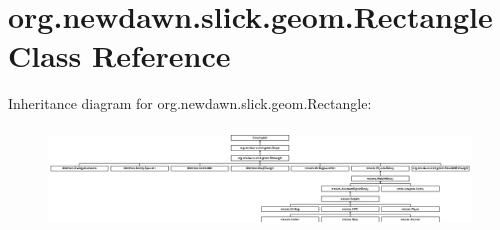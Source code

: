 \hypertarget{classorg_1_1newdawn_1_1slick_1_1geom_1_1_rectangle}{}\section{org.\+newdawn.\+slick.\+geom.\+Rectangle Class Reference}
\label{classorg_1_1newdawn_1_1slick_1_1geom_1_1_rectangle}
Inheritance diagram for org.\+newdawn.\+slick.\+geom.\+Rectangle\+:\begin{figure}[H]
\begin{center}
\leavevmode
\includegraphics[height=2.676580cm]{classorg_1_1newdawn_1_1slick_1_1geom_1_1_rectangle}
\end{center}
\end{figure}
